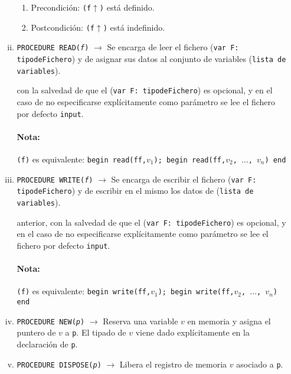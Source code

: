 \begin{enumerate}[I.]
\begin{enumerate}[i.]
\begin{enumerate}
\item Precondición: \texttt{(f$\uparrow$)} está definido.

\item Postcondición: \texttt{(f$\uparrow$)} está indefinido.

\end{enumerate}

\item \texttt{PROCEDURE READ(\textit{f})} $\rightarrow$ Se encarga de leer el
fichero (\texttt{var F: tipodeFichero}) y de asignar sus datos al conjunto de
variables (\texttt{lista de
variables}).

con la salvedad de que el (\texttt{var F: tipodeFichero}) es opcional, y en el
caso de no especificarse explícitamente como parámetro se lee el fichero por
defecto \texttt{input}.

\paragraph*{Nota:} \texttt{(f)} es equivalente: \texttt{begin read(ff,$v_1$);
begin read(ff,$v_2$, $\ldots$, $v_n$) end}

\item \texttt{PROCEDURE WRITE(\textit{f})} $\rightarrow$ Se encarga de escribir
el fichero (\texttt{var F: tipodeFichero}) y de escribir en el mismo los datos
de (\texttt{lista de
variables}).

anterior, con la salvedad de que el (\texttt{var F: tipodeFichero}) es opcional,
y en el caso de no especificarse explícitamente como parámetro se lee el fichero
por defecto \texttt{input}.

\paragraph*{Nota:} \texttt{(f)} es equivalente: \texttt{begin write(ff,$v_1$);
begin write(ff,$v_2$, $\ldots$, $v_n$) end}

\item \texttt{PROCEDURE NEW(\textit{p})} $\rightarrow$ Reserva una variable $v$ en memoria y asigna el puntero de $v$ a \texttt{p}. El tipado de $v$ viene dado explícitamente en la declaración de \texttt{p}.
\item \texttt{PROCEDURE DISPOSE(\textit{p})} $\rightarrow$ Libera el registro de memoria $v$ asociado a \texttt{p}.


\end{enumerate}
\end{enumerate}
